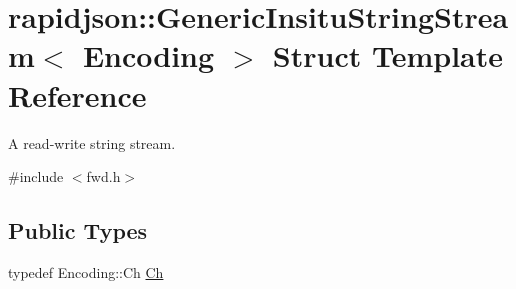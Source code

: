 \hypertarget{structrapidjson_1_1_generic_insitu_string_stream}{}\section{rapidjson\+::Generic\+Insitu\+String\+Stream$<$ Encoding $>$ Struct Template Reference}
\label{structrapidjson_1_1_generic_insitu_string_stream}


A read-\/write string stream.  




{\ttfamily \#include $<$fwd.\+h$>$}

\subsection*{Public Types}
\begin{DoxyCompactItemize}
\item 
typedef Encoding\+::\+Ch \mbox{\hyperlink{structrapidjson_1_1_generic_insitu_string_stream_a3a7ed47ee193d1e5f850aa841b743631}{Ch}}
\end{DoxyCompactItemize}
